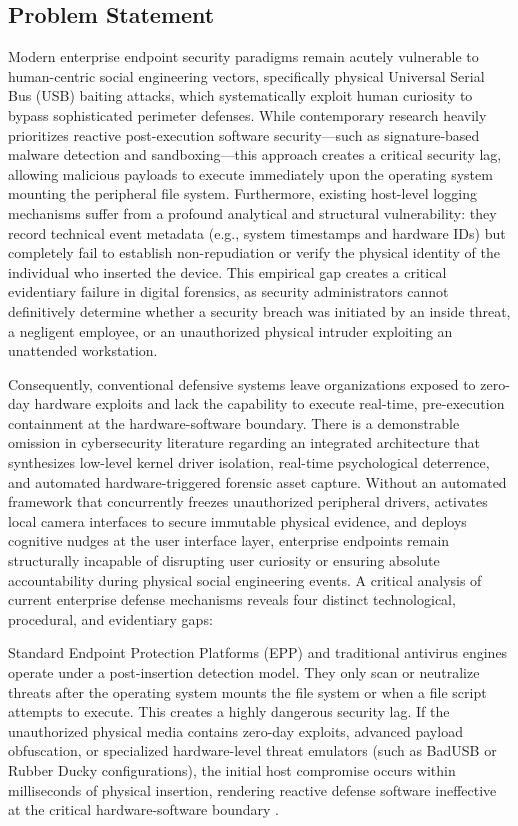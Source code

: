 \documentclass{ieeeaccess}
\begin{document}
\subsection{Problem Statement}
Modern enterprise endpoint security paradigms remain acutely vulnerable to human-centric social engineering vectors, specifically physical Universal Serial Bus (USB) baiting attacks, which systematically exploit human curiosity to bypass sophisticated perimeter defenses. While contemporary research heavily prioritizes reactive post-execution software security—such as signature-based malware detection and sandboxing—this approach creates a critical security lag, allowing malicious payloads to execute immediately upon the operating system mounting the peripheral file system. Furthermore, existing host-level logging mechanisms suffer from a profound analytical and structural vulnerability: they record technical event metadata (e.g., system timestamps and hardware IDs) but completely fail to establish non-repudiation or verify the physical identity of the individual who inserted the device. This empirical gap creates a critical evidentiary failure in digital forensics, as security administrators cannot definitively determine whether a security breach was initiated by an inside threat, a negligent employee, or an unauthorized physical intruder exploiting an unattended workstation.

Consequently, conventional defensive systems leave organizations exposed to zero-day hardware exploits and lack the capability to execute real-time, pre-execution containment at the hardware-software boundary. There is a demonstrable omission in cybersecurity literature regarding an integrated architecture that synthesizes low-level kernel driver isolation, real-time psychological deterrence, and automated hardware-triggered forensic asset capture. Without an automated framework that concurrently freezes unauthorized peripheral drivers, activates local camera interfaces to secure immutable physical evidence, and deploys cognitive nudges at the user interface layer, enterprise endpoints remain structurally incapable of disrupting user curiosity or ensuring absolute accountability during physical social engineering events. A critical analysis of current enterprise defense mechanisms reveals four distinct technological, procedural, and evidentiary gaps:

Standard Endpoint Protection Platforms (EPP) and traditional antivirus engines operate under a post-insertion detection model. They only scan or neutralize threats after the operating system mounts the file system or when a file script attempts to execute. This creates a highly dangerous security lag. If the unauthorized physical media contains zero-day exploits, advanced payload obfuscation, or specialized hardware-level threat emulators (such as BadUSB or Rubber Ducky configurations), the initial host compromise occurs within milliseconds of physical insertion, rendering reactive defense software ineffective at the critical hardware-software boundary \cite{ref3}.
\end{document}
